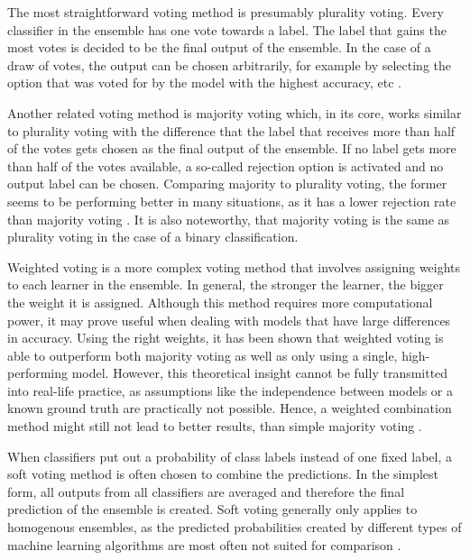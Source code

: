 The most straightforward voting method is presumably plurality voting. Every classifier in the ensemble has one vote towards a label. The label that gains the most votes is decided to be the final output of the ensemble. In the case of a draw of votes, the output can be chosen arbitrarily, for example by selecting the option that was voted for by the model with the highest accuracy, etc \cite{zhou2012}. 

Another related voting method is majority voting which, in its core, works similar to plurality voting with the difference that the label that receives more than half of the votes gets chosen as the final output of the ensemble. If no label gets more than half of the votes available, a so-called rejection option is activated and no output label can be chosen. Comparing majority to plurality voting, the former seems to be performing better in many situations, as it has a lower rejection rate than majority voting \cite{lin2003}. It is also noteworthy, that majority voting is the same as plurality voting in the case of a binary classification. 

Weighted voting is a more complex voting method that involves assigning weights to each learner in the ensemble. In general, the stronger the learner, the bigger the weight it is assigned. Although this method requires more computational power, it may prove useful when dealing with models that have large differences in accuracy. Using the right weights, it has been shown that weighted voting is able to outperform both majority voting as well as only using a single, high-performing model. However, this theoretical insight cannot be fully transmitted into real-life practice, as assumptions like the independence between models or a known ground truth are practically not possible. Hence, a weighted combination method might still not lead to better results, than simple majority voting \cite{zhou2012}.

When classifiers put out a probability of class labels instead of one fixed label, a soft voting method is often chosen to combine the predictions. In the simplest form, all outputs from all classifiers are averaged and therefore the final prediction of the ensemble is created. Soft voting generally only applies to homogenous ensembles, as the predicted probabilities created by different types of machine learning algorithms are most often not suited for comparison \cite{zhou2012}.

